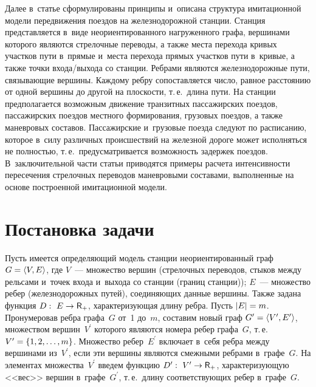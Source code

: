 \begin{multicols}{2}
      Далее в~статье сформулированы принципы и~описана структура 
имитационной модели передвижения поездов на железнодорожной станции. 
Станция представляется в~виде неориентированного нагруженного графа, 
вершинами которого являются стрелочные переводы, а также места перехода 
кривых участков пути в~прямые и~места перехода прямых участков пути в~кривые, 
а также точки входа/выхода со станции. Ребрами являются железнодорожные 
пути, связывающие вершины. Каждому ребру сопоставляется число, равное 
расстоянию от одной вершины до другой на плоскости, т.\,е.\ длина пути. На 
станции предполагается возможным движение транзитных пассажирских поездов, 
пассажирских поездов местного формирования, грузовых поездов, а также 
маневровых составов. Пассажирские и~грузовые поезда следуют по расписанию, 
которое в~силу различных происшествий на железной дороге может исполняться 
не полностью, т.\,е.\ предусматривается возможность задержек поездов. 
В~заключительной части статьи приводятся примеры расчета интенсивности 
пересечения стрелочных переводов маневровыми составами, выполненные на 
основе построенной имитационной модели.

\vspace*{-8pt}

\section{Постановка задачи}

\vspace*{-2pt}

      Пусть имеется определяющий модель станции неориентированный граф 
$G\hm= \langle V, E\rangle$, где $V$~--- множество вершин (стрелочных 
переводов, стыков между рельсами и~точек входа и~выхода со станции (границ 
станции)); $E$~--- множество ребер (железнодорожных путей), соединяющих 
данные вершины. Также задана функция $D:\ E\to {\sf R}_+$, характеризующая 
длину ребра. Пусть $\vert E\vert \hm=m$. Пронумеровав ребра графа~$G$ от~1 
до~$m$, составим новый граф $G^\prime\hm= \langle V^\prime, E^\prime\rangle$, 
множеством вершин~$V^\prime$ которого являются номера ребер графа~$G$, 
т.\,е.\ $V^\prime\hm= \{1,2,\ldots , m\}$. Множество ребер~$E^\prime$ включает 
в~себя ребра между вершинами из~$V^\prime$, если эти вершины являются 
смежными ребрами в~графе~$G$. На элементах множества~$V^\prime$ введем 
функцию $D^\prime:\ V^\prime \hm \to {\sf R}_+$, характеризующую <<вес>> 
вершин в~графе~$G^\prime$, т.\,е.\ длину соответствующих ребер в~графе~$G$.
      

\end{multicols}
